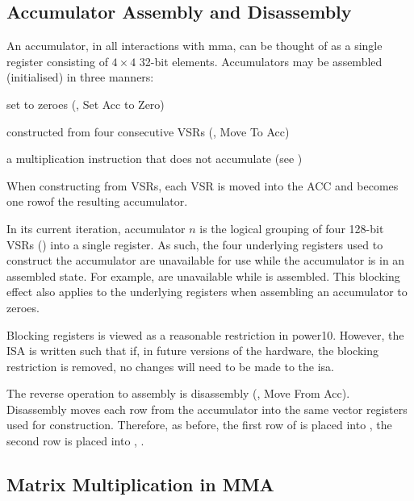 \documentclass[\main/thesis.tex]{subfiles}
\begin{document}
\subsection{Accumulator Assembly and Disassembly}
\label{sec:assDis}
An accumulator, in all interactions with \gls{mma}, can be thought of as a single register consisting of $4 \times 4$ 32-bit elements.
Accumulators may be assembled (initialised) in three manners:
\begin{enumerate*}[itemjoin*={{ and }}, label=\textbf{(\arabic*)}, after={.}]
  \item set to zeroes (, Set Acc to Zero)
  \item constructed from four consecutive VSRs (, Move To Acc)
  \item a multiplication instruction that does not accumulate (see )
\end{enumerate*}
When constructing from VSRs, each VSR is moved into the ACC and becomes one row\footnotemark of the resulting accumulator.

In its current iteration, accumulator $n$ is the logical grouping of four 128-bit VSRs () into a single register.
As such, the four underlying registers used to construct the accumulator are unavailable for use while the accumulator is in an assembled state.
For example,  are unavailable while  is assembled.
This blocking effect also applies to the underlying registers when assembling an accumulator to zeroes.

Blocking registers is viewed as a reasonable restriction in \gls{power10}.
However, the ISA is written such that if, in future versions of the hardware, the blocking restriction is removed, no changes will need to be made to the \gls{isa}.

The reverse operation to assembly is disassembly (, Move From Acc).
Disassembly moves each row from the accumulator into the same vector registers used for construction.
Therefore, as before, the first row of  is placed into , the second row is placed into , \etc.

\subsection{Matrix Multiplication in MMA}
\label{sec:matMulMMA}
\end{document}
